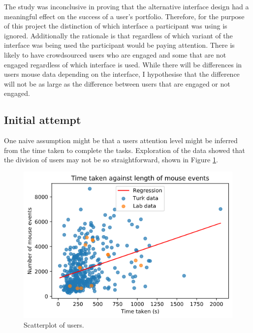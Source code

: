\documentclass{article}
\begin{document}
The study was inconclusive in proving that the alternative interface design had a meaningful effect on the success of a user's portfolio.
Therefore, for the purpose of this project the distinction of which interface a participant was using is ignored.
Additionally the rationale is that regardless of which variant of the interface was being used the participant would be paying attention.
There is likely to have crowdsourced users who are engaged and some that are not engaged regardless of which interface is used.
While there will be differences in users mouse data depending on the interface, I hypothesise that the difference will not be as large as the difference between users that are engaged or not engaged. 

\subsection{Initial attempt}

One naive assumption might be that a users attention level might be inferred from the time taken to complete the tasks.
Exploration of the data showed that the division of users may not be so straightforward, shown in Figure \ref{fig:scatterplot}.

\begin{figure}[!h]
    \centering
    \includegraphics[scale=0.55]{Images/TimeTaken-Mouse-Events.png}
    \caption{Scatterplot of users.}
    \label{fig:scatterplot}
\end{figure}
\end{document}
